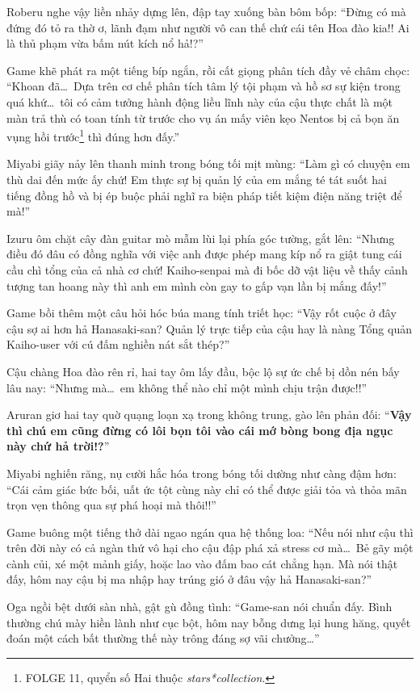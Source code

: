 \documentclass[../main.tex]{subfiles}
\begin{document}
Roberu nghe vậy liền nhảy dựng lên, đập tay xuống bàn bôm bốp: ``Đừng có mà đứng đó tỏ ra thờ ơ, lãnh đạm như người vô can thế chứ cái tên Hoa đào kia!! Ai là thủ phạm vừa bấm nút kích nổ hả!?''

Game khẽ phát ra một tiếng bíp ngắn, rồi cất giọng phân tích đầy vẻ châm chọc: ``Khoan đã\dots\ Dựa trên cơ chế phân tích tâm lý tội phạm và hồ sơ sự kiện trong quá khứ\dots\ tôi có cảm tưởng hành động liều lĩnh này của cậu thực chất là một màn trả thù có toan tính từ trước cho vụ án mấy viên kẹo Nentos bị cả bọn ăn vụng hồi trước\footnote{{\humanist FOLGE 11}, quyển số Hai thuộc \textit{stars*collection}.} thì đúng hơn đấy.''

Miyabi giãy nảy lên thanh minh trong bóng tối mịt mùng: ``Làm gì có chuyện em thù dai đến mức ấy chứ! Em thực sự bị quản lý của em mắng té tát suốt hai tiếng đồng hồ và bị ép buộc phải nghĩ ra biện pháp tiết kiệm điện năng triệt để mà!''

Izuru ôm chặt cây đàn guitar mò mẫm lùi lại phía góc tường, gắt lên: ``Nhưng điều đó đâu có đồng nghĩa với việc anh được phép mang kíp nổ ra giật tung cái cầu chì tổng của cả nhà cơ chứ! Kaiho-senpai mà đi bốc dỡ vật liệu về thấy cảnh tượng tan hoang này thì anh em mình còn gay to gấp vạn lần bị mắng đấy!''

Game bồi thêm một câu hỏi hóc búa mang tính triết học: ``Vậy rốt cuộc ở đây cậu sợ ai hơn hả Hanasaki-san? Quản lý trực tiếp của cậu hay là nàng Tổng quản Kaiho-user với cú đấm nghiền nát sắt thép?''

Cậu chàng Hoa đào rên rỉ, hai tay ôm lấy đầu, bộc lộ sự ức chế bị dồn nén bấy lâu nay: ``Nhưng mà\dots\ em không thể nào chỉ một mình chịu trận được!!''

Aruran giơ hai tay quờ quạng loạn xạ trong không trung, gào lên phản đối: ``\textbf{Vậy thì chú em cũng đừng có lôi bọn tôi vào cái mớ bòng bong địa ngục này chứ hả trời!?}''

Miyabi nghiến răng, nụ cười hắc hóa trong bóng tối dường như càng đậm hơn: ``Cái cảm giác bức bối, uất ức tột cùng này chỉ có thể được giải tỏa và thỏa mãn trọn vẹn thông qua sự phá hoại mà thôi!!''

Game buông một tiếng thở dài ngao ngán qua hệ thống loa: ``Nếu nói như cậu thì trên đời này có cả ngàn thứ vô hại cho cậu đập phá xả stress cơ mà\dots\ Bẻ gãy một cành củi, xé một mảnh giấy, hoặc lao vào đấm bao cát chẳng hạn. Mà nói thật đấy, hôm nay cậu bị ma nhập hay trúng gió ở đâu vậy hả Hanasaki-san?''

Oga ngồi bệt dưới sàn nhà, gật gù đồng tình: ``Game-san nói chuẩn đấy. Bình thường chú mày hiền lành như cục bột, hôm nay bỗng dưng lại hung hăng, quyết đoán một cách bất thường thế này trông đáng sợ vãi chưởng\dots''
\end{document}
